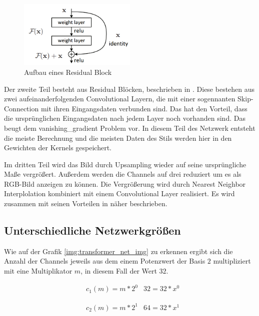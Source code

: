 \begin{figure}[H]
	\centering
	\includegraphics[width=0.50\textwidth]{resources/content/residual_block.png}
	\caption{Aufbau eines Residual Block \cite{residual_block_img}}
	\label{img:residual_block_img}
\end{figure}

Der zweite Teil besteht aus Residual Blöcken, beschrieben in \cite{DBLP:journals/corr/HeZRS15}. Diese bestehen aus zwei aufeinanderfolgenden Convolutional Layern, die mit einer sogennanten Skip-Connection mit ihren Eingangsdaten verbunden sind. Das hat den Vorteil, dass die ursprünglichen Eingangsdaten nach jedem Layer noch vorhanden sind. Das beugt dem \gls{vanishing_gradient} Problem vor. In diesem Teil des Netzwerk entsteht die meiste Berechnung und die meisten Daten des Stils werden hier in den Gewichten der Kernels gespeichert.

Im dritten Teil wird das Bild durch Upsampling wieder auf seine ursprüngliche Maße vergrößert. Außerdem werden die Channels auf drei reduziert um es als RGB-Bild anzeigen zu können. Die Vergrößerung wird durch Nearest Neighbor Interplolation kombiniert mit einem Convolutional Layer realisiert.
Es wird zusammen mit seinen Vorteilen in \cite{odena2016deconvolution} näher beschrieben.

\pagebreak

\subsection{Unterschiedliche Netzwerkgrößen}

Wie auf der Grafik \ref{img:transformer_net_img} zu erkennen ergibt sich die Anzahl der Channels jeweils aus dem einem Potenzwert der Basis $ 2 $ multipliziert mit eine Multiplikator $ m $, in diesem Fall der Wert $ 32 $.

\begin{align}
	& c_{1}(m) = m * 2^{0}
	& 32 = 32 * x^{0}
\end{align}

\begin{align}
	& c_{2}(m) = m * 2^{1}
	& 64 = 32 * x^{1}
\end{align}

